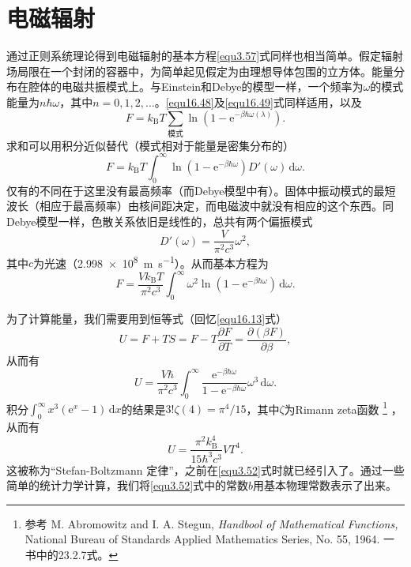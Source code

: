 \section{电磁辐射}\label{sec16.8}
通过正则系统理论得到电磁辐射的基本方程\eqref{equ3.57}式同样也相当简单。假定辐射场局限在一个封闭的容器中，为简单起见假定为由理想导体包围的立方体。能量分布在腔体的电磁共振模式上。与Einstein和Debye的模型一样，一个频率为$\omega$的模式能量为$n\hbar\omega$，其中$n=0,1,2,\dots$。\eqref{equ16.48}及\eqref{equ16.49}式同样适用，以及
\begin{equation}
F=k_\text{B}T\sum\limits_\text{模式}\ln(1-\mathrm e^{-\beta\hbar\omega(\lambda)}).
\end{equation}
求和可以用积分近似替代（模式相对于能量是密集分布的）
\begin{equation}
F=k_\text{B}T\int_0^\infty \ln(1-\mathrm e^{-\beta\hbar\omega})D'(\omega)\,\mathrm d\omega.
\end{equation}
仅有的不同在于这里没有最高频率（而Debye模型中有）。固体中振动模式的最短波长（相应于最高频率）由核间距决定，而电磁波中就没有相应的这个东西。同Debye模型一样，色散关系依旧是线性的，总共有两个偏振模式
\begin{equation}
D'(\omega)=\frac{V}{\pi^2c^3}\omega^2,
\end{equation}
其中$c$为光速（\SI{2.998e8}{\meter\per\second}）。从而基本方程为
\begin{equation}
F= \frac{Vk_\text{B}T}{\pi^2c^3}\int_0^\infty \omega^2\ln(1-\mathrm e^{-\beta\hbar\omega})\,\mathrm d\omega.
\end{equation}

为了计算能量，我们需要用到恒等式（回忆\eqref{equ16.13}式）
\begin{equation}
U=F+TS=F-T\frac{\partial F}{\partial T}=\frac{\partial(\beta F)}{\partial\beta},
\end{equation}
从而有
\begin{equation}
U=\frac{V\hbar}{\pi^2c^3}\int_0^\infty \frac{\mathrm e^{-\beta\hbar\omega}}{1-\mathrm e^{-\beta\hbar\omega}}\omega^3\,\mathrm d\omega.
\end{equation}
积分$\int_0^\infty x^3(\mathrm e^x-1)\,\mathrm dx$的结果是$3!\zeta(4)=\pi^4/15$，其中$\zeta$为Rimann zeta函数%
\footnote{参考 M. Abromowitz and I. A. Stegun, {\it Handbool of Mathematical Functions,} National Bureau of Standards Applied Mathematics Series, No. 55, 1964. 一书中的23.2.7式。}%
，从而有
\begin{equation}
U=\frac{\pi^2k_\text{B}^4}{15\hbar^3c^3}VT^4.
\end{equation}
这被称为``Stefan-Boltzmann 定律''，之前在\eqref{equ3.52}式时就已经引入了。通过一些简单的统计力学计算，我们将\eqref{equ3.52}式中的常数$b$用基本物理常数表示了出来。

